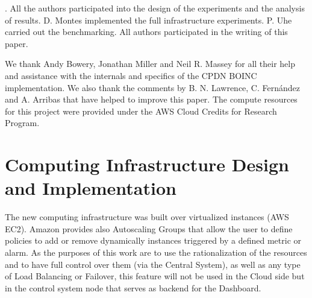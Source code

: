 \documentclass[journal abbreviation, manuscript]{copernicus}
\begin{document}
\authorcontribname. All the authors participated into the design of the experiments and the analysis of results. D. Montes implemented the full infrastructure experiments. P. Uhe carried out the benchmarking. All authors participated in the writing of this paper.

\begin{acknowledgements}
We thank Andy Bowery, Jonathan Miller and Neil R. Massey for all their help and assistance with the internals and specifics of the CPDN BOINC implementation. We also thank the comments by B. N. Lawrence, C. Fernández and A. Arribas that have helped to improve this paper. The compute resources for this project were provided under the AWS Cloud Credits for Research Program.

\end{acknowledgements}











\appendix
\section{Computing Infrastructure Design and Implementation}

The new computing infrastructure was built over virtualized instances (AWS EC2). Amazon provides also Autoscaling Groups that allow the user to define policies to add or remove dynamically instances triggered by a defined metric or alarm. As the purposes of this work are to use the rationalization of the resources and to have full control over them (via the Central System), as well as any type of Load Balancing or Failover, this feature will not be used in the Cloud side but in the control system node that serves as backend for the Dashboard.

\end{document}
